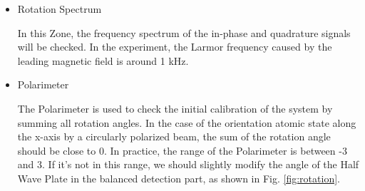 \documentclass{article}
\begin{document}
\begin{itemize}
    \item Rotation Spectrum

    In this Zone, the frequency spectrum of the in-phase and quadrature signals will be checked. In the experiment, the Larmor frequency caused by the leading magnetic field is around 1 kHz.
    
    \item Polarimeter

    The Polarimeter is used to check the initial calibration of the system by summing all rotation angles. In the case of the orientation atomic state along the x-axis by a circularly polarized beam, the sum of the rotation angle should be close to 0. In practice, the range of the Polarimeter is between -3 and 3. If it's not in this range, we should slightly modify the angle of the Half Wave Plate in the balanced detection part, as shown in Fig. \ref{fig:rotation}.
    
\end{itemize}
\end{document}
